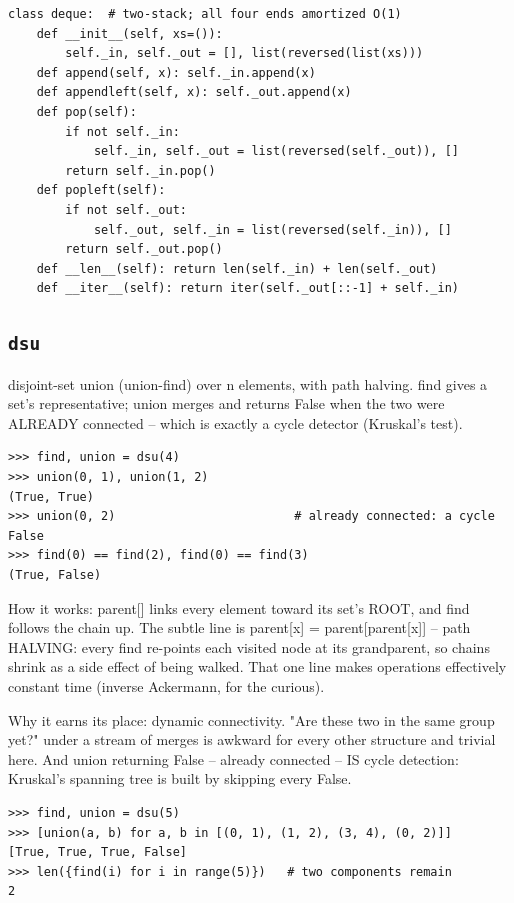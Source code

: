 \documentclass[10pt,letterpaper]{book}
\begin{document}
\begin{lstlisting}[style=ex]
class deque:  # two-stack; all four ends amortized O(1)
    def __init__(self, xs=()):
        self._in, self._out = [], list(reversed(list(xs)))
    def append(self, x): self._in.append(x)
    def appendleft(self, x): self._out.append(x)
    def pop(self):
        if not self._in:
            self._in, self._out = list(reversed(self._out)), []
        return self._in.pop()
    def popleft(self):
        if not self._out:
            self._out, self._in = list(reversed(self._in)), []
        return self._out.pop()
    def __len__(self): return len(self._in) + len(self._out)
    def __iter__(self): return iter(self._out[::-1] + self._in)
\end{lstlisting}
\subsection{\texttt{dsu}}\label{def:dsu}
disjoint-set union (union-find) over n elements, with path halving. find gives a set's representative; union merges and returns False when the two were ALREADY connected -- which is exactly a cycle detector (Kruskal's test).
\begin{lstlisting}[style=ex]
>>> find, union = dsu(4)
>>> union(0, 1), union(1, 2)
(True, True)
>>> union(0, 2)                         # already connected: a cycle
False
>>> find(0) == find(2), find(0) == find(3)
(True, False)
\end{lstlisting}

How it works: parent[] links every element toward its set's ROOT, and find follows the chain up. The subtle line is parent[x] = parent[parent[x]] -- path HALVING: every find re-points each visited node at its grandparent, so chains shrink as a side effect of being walked. That one line makes operations effectively constant time (inverse Ackermann, for the curious).


Why it earns its place: dynamic connectivity. "Are these two in the same group yet?" under a stream of merges is awkward for every other structure and trivial here. And union returning False -- already connected -- IS cycle detection: Kruskal's spanning tree is built by skipping every False.

\begin{lstlisting}[style=ex]
>>> find, union = dsu(5)
>>> [union(a, b) for a, b in [(0, 1), (1, 2), (3, 4), (0, 2)]]
[True, True, True, False]
>>> len({find(i) for i in range(5)})   # two components remain
2
\end{lstlisting}
\end{document}
